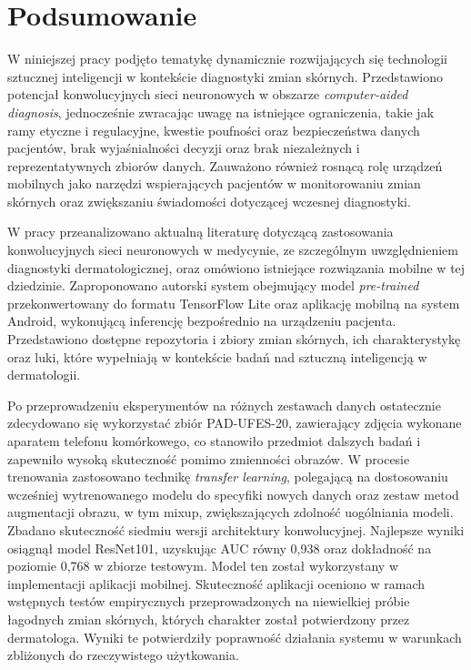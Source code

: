 
\def\filename{podsumowanie}

\chapter{Podsumowanie}\label{ch:podsumowanie}
W niniejszej pracy podjęto tematykę dynamicznie rozwijających się technologii sztucznej inteligencji w kontekście diagnostyki zmian skórnych.
Przedstawiono potencjał konwolucyjnych sieci neuronowych w obszarze \textit{computer-aided diagnosis}, jednocześnie zwracając uwagę na istniejące ograniczenia, takie jak ramy etyczne i regulacyjne, kwestie poufności oraz bezpieczeństwa danych pacjentów, brak wyjaśnialności decyzji oraz brak niezależnych i reprezentatywnych zbiorów danych.
Zauważono również rosnącą rolę urządzeń mobilnych jako narzędzi wspierających pacjentów w monitorowaniu zmian skórnych oraz zwiększaniu świadomości dotyczącej wczesnej diagnostyki.

W pracy przeanalizowano aktualną literaturę dotyczącą zastosowania konwolucyjnych sieci neuronowych w medycynie, ze szczególnym uwzględnieniem diagnostyki dermatologicznej, oraz omówiono istniejące rozwiązania mobilne w tej dziedzinie.
Zaproponowano autorski system obejmujący model \textit{pre-trained} przekonwertowany do formatu TensorFlow Lite oraz aplikację mobilną na system Android, wykonującą inferencję bezpośrednio na urządzeniu pacjenta.
Przedstawiono dostępne repozytoria i zbiory zmian skórnych, ich charakterystykę oraz luki, które wypełniają w kontekście badań nad sztuczną inteligencją w dermatologii.

Po przeprowadzeniu eksperymentów na różnych zestawach danych ostatecznie zdecydowano się wykorzystać zbiór PAD-UFES-20, zawierający zdjęcia wykonane aparatem telefonu komórkowego, co stanowiło przedmiot dalszych badań i zapewniło wysoką skuteczność pomimo zmienności obrazów.
W procesie trenowania zastosowano technikę \textit{transfer learning}, polegającą na dostosowaniu wcześniej wytrenowanego modelu do specyfiki nowych danych oraz zestaw metod augmentacji obrazu, w tym mixup, zwiększających zdolność uogólniania modeli.
Zbadano skuteczność siedmiu wersji architektury konwolucyjnej.
Najlepsze wyniki osiągnął model ResNet101, uzyskując AUC równy 0,938 oraz dokładność na poziomie 0,768 w zbiorze testowym.
Model ten został wykorzystany w implementacji aplikacji mobilnej.
Skuteczność aplikacji oceniono w ramach wstępnych testów empirycznych przeprowadzonych na niewielkiej próbie łagodnych zmian skórnych, których charakter został potwierdzony przez dermatologa.
Wyniki te potwierdziły poprawność działania systemu w warunkach zbliżonych do rzeczywistego użytkowania.

